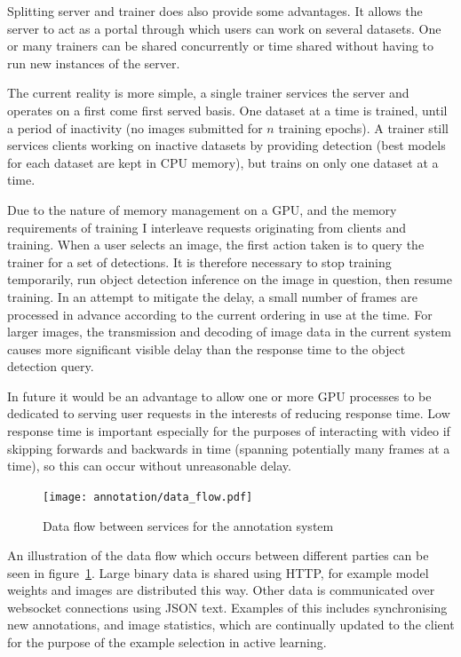 Splitting server and trainer does also provide some advantages. It allows the server to act as a portal through which users can work on several datasets. One or many trainers can be shared concurrently or time shared without having to run new instances of the server. 

The current reality is more simple, a single trainer services the server and operates on a first come first served basis. One dataset at a time is trained, until a period of inactivity (no images submitted for $ n $ training epochs). A trainer still services clients working on inactive datasets by providing detection (best models for each dataset are kept in \gls{CPU} memory), but trains on only one dataset at a time. 

Due to the nature of memory management on a \gls{GPU}, and the memory requirements of training I interleave requests originating from clients and training. When a user selects an image, the first action taken is to query the trainer for a set of detections. It is therefore necessary to stop training temporarily, run object detection inference on the image in question, then resume training. In an attempt to mitigate the delay, a small number of frames are processed in advance according to the current ordering in use at the time. For larger images, the transmission and decoding of image data in the current system causes more significant visible delay than the response time to the object detection query.

In future it would be an advantage to allow one or more \gls{GPU} processes to be dedicated to serving user requests in the interests of reducing response time. Low response time is important especially for the purposes of interacting with video if skipping forwards and backwards in time (spanning potentially many frames at a time), so this can occur without unreasonable delay.

\begin{figure}[h!]
  \centering
  \texttt{[image: annotation/data\_flow.pdf]}
  \caption{Data flow between services for the annotation system}  
  \label{fig:data_flow}
\end{figure}

An illustration of the data flow which occurs between different parties can be seen in figure~\ref{fig:data_flow}. Large binary data is shared using \gls{HTTP}, for example model weights and images are distributed this way. Other data is communicated over websocket connections using \gls{JSON} text. Examples of this includes synchronising new annotations, and image statistics, which are continually updated to the client for the purpose of the example selection in active learning.

